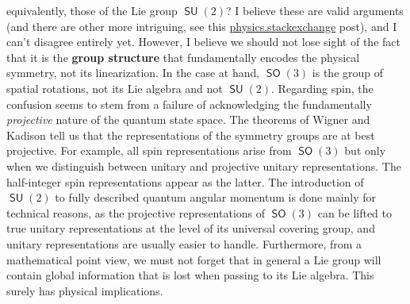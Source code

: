 \documentclass[a4paper]{article}
\DeclareMathOperator{\SO}{\mathsf{SO}}
\DeclareMathOperator{\SU}{\mathsf{SU}}
\begin{document}
    equivalently, those of the Lie group $\SU(2)$? I believe
    these are valid arguments (and there are other more
    intriguing, see this
    \href{https://physics.stackexchange.com/questions/492965/why-lie-algebras-if-what-we-care-about-in-physics-are-groups}{physics.stackexchange}
    post), and I can't disagree entirely yet. However, I
    believe we should not lose sight of the fact that it is
    the \textbf{group structure} that fundamentally encodes
    the physical symmetry, not its linearization.  In the
    case at hand, $\SO(3)$ is the group of spatial
    rotations, not its Lie algebra and not $\SU(2)$.
    Regarding spin, the confusion seems to stem from a
    failure of acknowledging the fundamentally
    \textit{projective} nature of the quantum state space.
    The theorems of Wigner and Kadison tell us that the
    representations of the symmetry groups are at best
    projective. For example, all spin representations arise
    from $\SO(3)$ but only when we distinguish between
    unitary and projective unitary representations.  The
    half-integer spin representations appear as the latter.
    The introduction of $\SU(2)$ to fully described quantum
    angular momentum is done mainly for technical reasons,
    as the projective representations of $\SO(3)$ can be
    lifted to true unitary representations at the level of
    its universal covering group, and unitary
    representations are usually easier to handle.
    Furthermore, from a mathematical point view, we must not
    forget that in general a Lie group will contain global
    information that is lost when passing to its Lie
    algebra. This surely has physical implications.
\end{document}

